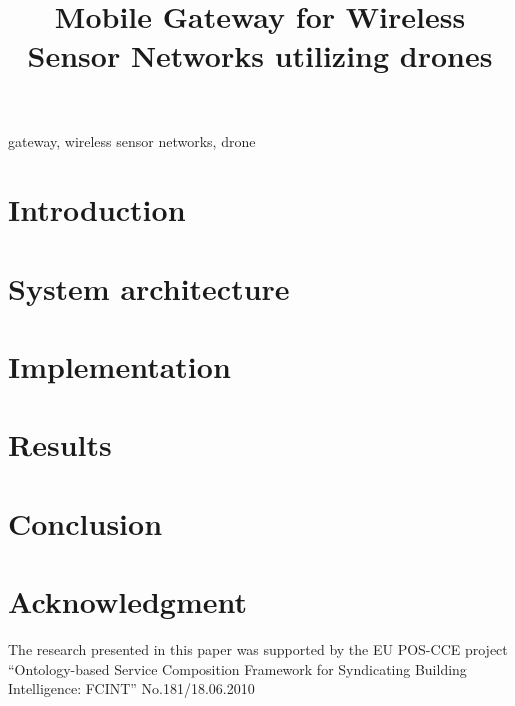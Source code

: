 \documentclass[conference]{IEEEtran}
\begin{document}
\title{Mobile Gateway for Wireless Sensor Networks utilizing drones}



\author{
  }

\maketitle

\begin{abstract} 

\cite{doroftei2007omnidirectional}
\end{abstract}

\begin{IEEEkeywords}
gateway, wireless sensor networks, drone
\end{IEEEkeywords}

\section{Introduction}
\label{sec:introduction}


\section{System architecture}
\label{sec:architecture}


\section{Implementation}
\label{sec:implementation}



\section{Results} 
\label{sec:results}


\section{Conclusion}
\label{sec:conclusion}



\section*{Acknowledgment}
\label{sec:acknowledgment}

The research presented in this paper was supported by the EU POS-CCE project
“Ontology-based Service Composition Framework for Syndicating Building
Intelligence: FCINT” No.181/18.06.2010




\end{document}
